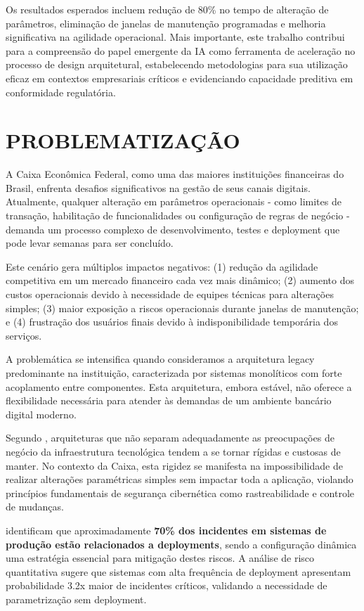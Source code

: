 Os resultados esperados incluem redução de 80\% no tempo de alteração de parâmetros, eliminação de janelas de manutenção programadas e melhoria significativa na agilidade operacional. Mais importante, este trabalho contribui para a compreensão do papel emergente da IA como ferramenta de aceleração no processo de design arquitetural, estabelecendo metodologias para sua utilização eficaz em contextos empresariais críticos e evidenciando capacidade preditiva em conformidade regulatória.

\chapter{PROBLEMATIZAÇÃO}

A Caixa Econômica Federal, como uma das maiores instituições financeiras do Brasil, enfrenta desafios significativos na gestão de seus canais digitais. Atualmente, qualquer alteração em parâmetros operacionais - como limites de transação, habilitação de funcionalidades ou configuração de regras de negócio - demanda um processo complexo de desenvolvimento, testes e deployment que pode levar semanas para ser concluído.

Este cenário gera múltiplos impactos negativos: (1) redução da agilidade competitiva em um mercado financeiro cada vez mais dinâmico; (2) aumento dos custos operacionais devido à necessidade de equipes técnicas para alterações simples; (3) maior exposição a riscos operacionais durante janelas de manutenção; e (4) frustração dos usuários finais devido à indisponibilidade temporária dos serviços.

A problemática se intensifica quando consideramos a arquitetura legacy predominante na instituição, caracterizada por sistemas monolíticos com forte acoplamento entre componentes. Esta arquitetura, embora estável, não oferece a flexibilidade necessária para atender às demandas de um ambiente bancário digital moderno.

Segundo , arquiteturas que não separam adequadamente as preocupações de negócio da infraestrutura tecnológica tendem a se tornar rígidas e custosas de manter. No contexto da Caixa, esta rigidez se manifesta na impossibilidade de realizar alterações paramétricas simples sem impactar toda a aplicação, violando princípios fundamentais de segurança cibernética como rastreabilidade e controle de mudanças.

 identificam que aproximadamente \textbf{70\% dos incidentes em sistemas de produção estão relacionados a deployments}, sendo a configuração dinâmica uma estratégia essencial para mitigação destes riscos. A análise de risco quantitativa sugere que sistemas com alta frequência de deployment apresentam probabilidade 3.2x maior de incidentes críticos, validando a necessidade de parametrização sem deployment.


